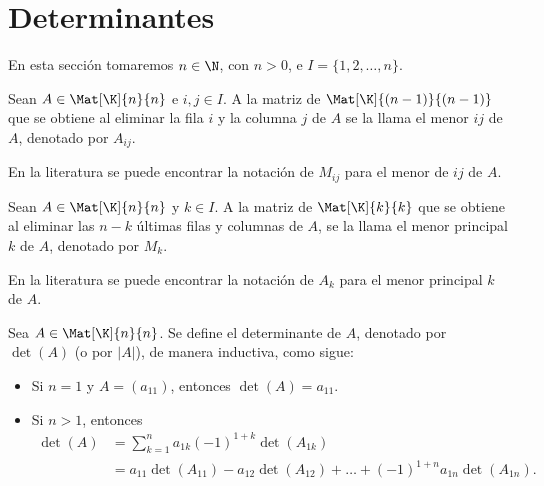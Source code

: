 \documentclass[a4,11pt]{aleph-notas}
\begin{document}
\encabezado

\section{Determinantes}

En esta sección tomaremos $n\in \N$, con $n>0$, e $I = \{ 1, 2, \ldots, n\}$.

\begin{defi}[Menor]
    Sean $A\in \Mat[\K]{n}{n}$ e $i,j\in I$. A la matriz de $\Mat[\K]{(n-1)}{(n-1)}$ que se obtiene al eliminar la fila $i$ y la columna $j$ de $A$ se la llama el menor $ij$ de $A$, denotado por $A_{ij}$.
\end{defi}

\begin{advertencia}
    En la literatura se puede encontrar la notación de $M_{ij}$ para el menor de $ij$ de $A$.
\end{advertencia}

\begin{defi}
    Sean $A\in \Mat[\K]{n}{n}$ y $k\in I$. A la matriz de $\Mat[\K]{k}{k}$ que se obtiene al eliminar las $n-k$ últimas filas y columnas de $A$, se la llama el menor principal $k$ de $A$, denotado por $M_{k}$.
\end{defi}

\begin{advertencia}
    En la literatura se puede encontrar la notación de $A_{k}$ para el menor principal $k$ de $A$.
\end{advertencia}


\begin{defi}[Determinantes] 
    Sea $A\in \Mat[\K]{n}{n}$. Se define el determinante de $A$, denotado por $\det(A)$ (o por $|A|$), de manera inductiva, como sigue:
    \begin{itemize}
    \item 
        Si $n=1$ y $A=(a_{11})$, entonces $\det(A) = a_{11}$.
    \item
        Si $n>1$, entonces
        \begin{align*}
            \det(A) 
            & = \sum_{k=1}^n a_{1k}(-1)^{1+k}\det(A_{1k})\\
            & = a_{11}\det(A_{11}) - a_{12}\det(A_{12}) 
            + \ldots +  (-1)^{1+n} a_{1n}\det(A_{1n}).
        \end{align*}
    \end{itemize}
\end{defi}
\end{document}
